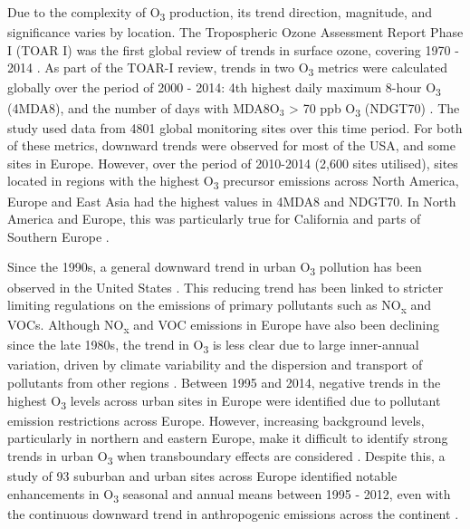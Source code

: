 \documentclass[journal abbreviation, manuscript]{copernicus}
\begin{document}
Due to the complexity of O\textsubscript{3} production, its trend direction, magnitude, and significance varies by location. The Tropospheric Ozone Assessment Report Phase I (TOAR I) was the first global review of trends in surface ozone, covering 1970 - 2014 \citep{fleming_2018, Gaudel2018}. As part of the TOAR-I review, trends in two O\textsubscript{3} metrics were calculated globally over the period of 2000 - 2014: 4th highest daily maximum 8-hour O\textsubscript{3} (4MDA8), and the number of days with MDA8O$_3$ > 70 ppb O\textsubscript{3} (NDGT70) \citep{fleming_2018}. The study used data from 4801 global monitoring sites over this time period. For both of these metrics, downward trends were observed for most of the USA, and some sites in Europe. However, over the period of 2010-2014 (2,600 sites utilised), sites located in regions with the highest O\textsubscript{3} precursor emissions across North America, Europe and East Asia had the highest values in 4MDA8 and NDGT70. In North America and Europe, this was particularly true for California and parts of Southern Europe \citep{fleming_2018}.

Since the 1990s, a general downward trend in urban O\textsubscript{3} pollution has been observed in the United States \citep{acp-20-3191-2020}. This reducing trend has been linked to stricter limiting regulations on the emissions of primary pollutants such as NO\textsubscript{x} and VOCs. Although NO\textsubscript{x} and VOC emissions in Europe have also been declining since the late 1980s, the trend in O\textsubscript{3} is less clear due to large inner-annual variation, driven by climate variability and the dispersion and transport of pollutants from other regions \citep{acp-6-51-2006, acp-18-5589-2018}. Between 1995 and 2014, negative trends in the highest O\textsubscript{3} levels across urban sites in Europe were identified due to pollutant emission restrictions across Europe. However, increasing background levels, particularly in northern and eastern Europe, make it difficult to identify strong trends in urban O\textsubscript{3} when transboundary effects are considered \citep{acp-18-5589-2018}. Despite this, a study of 93 suburban and urban sites across Europe identified notable enhancements in O\textsubscript{3} seasonal and annual means between 1995 - 2012, even with the continuous downward trend in anthropogenic emissions across the continent \citep{acp-18-5589-2018}.
\end{document}
